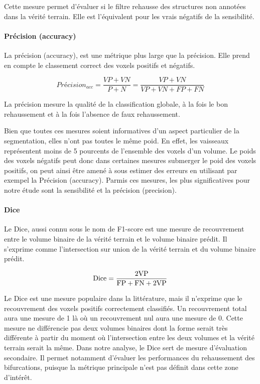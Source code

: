 Cette mesure permet d'évaluer si le filtre rehausse des structures non annotées dans la vérité terrain. Elle est l'équivalent pour les vrais négatifs de la sensibilité.

\paragraph{Précision (accuracy)}

La précision (accuracy), est une métrique plus large que la précision. Elle prend en compte le classement correct des voxels positifs et négatifs. 

\begin{equation}
  Précision_{acc} = \frac{VP+VN}{P+N} = \frac{VP+VN}{VP+VN+FP+FN}
\end{equation}

La précision mesure la qualité de la classification globale, à la fois le bon rehaussement et à la fois l'absence de faux rehaussement.

Bien que toutes ces mesures soient informatives d'un aspect particulier de la segmentation, elles n'ont pas toutes le même poid. En effet, les vaisseaux représentent moins de 5 pourcents de l'ensemble des voxels d'un volume. Le poids des voxels négatifs peut donc dans certaines mesures submerger le poid des voxels positifs, on peut ainsi être amené à sous estimer des erreurs en utilisant par exempel la Précision (accuracy). Parmis ces mesures, les plus significatives pour notre étude sont la sensibilité et la précision (precision).


\paragraph{Dice}

Le Dice, aussi connu sous le nom de F1-score est une mesure de recouvrement entre le volume binaire de la vérité terrain et le volume binaire prédit. Il s'exprime comme l'intersection sur union de la vérité terrain et du volume binaire prédit.

\begin{equation}
  \textrm{Dice} = \frac{2 \textrm{VP}}{\textrm{FP} + \textrm{FN} + 2 \textrm{VP}} \\ 
\end{equation}

Le Dice est une mesure populaire dans la littérature, mais il n'exprime que le recouvrement des voxels positifs correctement classifiés. Un recouvrement total aura une mesure de 1 là où un recouvrement nul aura une mesure de 0. Cette mesure ne différencie pas deux volumes binaires dont la forme serait très différente à partir du moment où l'intersection entre les deux volumes et la vérité terrain serait la même. Dans notre analyse, le Dice sert de mesure d'évaluation secondaire. Il permet notamment d'évaluer les performances du rehaussement des bifurcations, puisque la métrique principale n'est pas définit dans cette zone d'intérêt.

